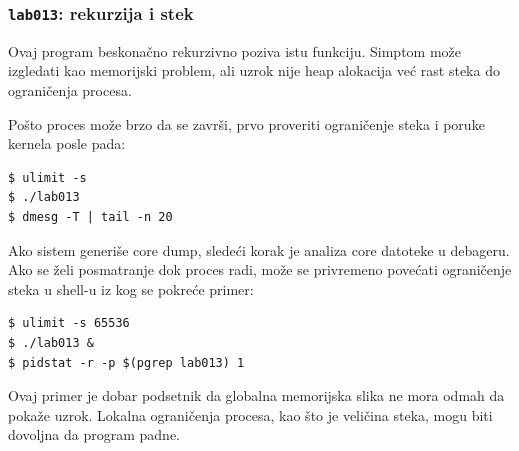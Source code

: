 \subsubsection{\texorpdfstring{\texttt{lab013}: rekurzija i stek}{lab013: rekurzija i stek}}\label{lab013-rekurzija-stek}

Ovaj program beskonačno rekurzivno poziva istu funkciju. Simptom može izgledati kao memorijski problem, ali uzrok nije heap alokacija već rast steka do ograničenja procesa.


Pošto proces može brzo da se završi, prvo proveriti ograničenje steka i poruke kernela posle pada:

\begin{verbatim}
$ ulimit -s
$ ./lab013
$ dmesg -T | tail -n 20
\end{verbatim}

Ako sistem generiše core dump, sledeći korak je analiza core datoteke u debageru. Ako se želi posmatranje dok proces radi, može se privremeno povećati ograničenje steka u shell-u iz kog se pokreće primer:

\begin{verbatim}
$ ulimit -s 65536
$ ./lab013 &
$ pidstat -r -p $(pgrep lab013) 1
\end{verbatim}

Ovaj primer je dobar podsetnik da globalna memorijska slika ne mora odmah da pokaže uzrok. Lokalna ograničenja procesa, kao što je veličina steka, mogu biti dovoljna da program padne.
